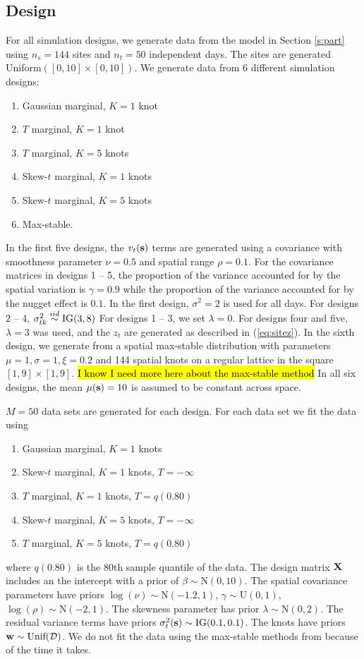 \documentclass[11pt]{article}
\begin{document}
\subsection{Design}\label{s:simdesign}
For all simulation designs, we generate data from the model in Section \ref{s:part} using $n_s=144$ sites and $n_t=50$ independent days.
The sites are generated Uniform$([0, 10] \times [0, 10])$.
We generate data from 6 different simulation designs:
\begin{enumerate} \setlength{\itemsep}{-0.5em}
  \item Gaussian marginal, $K=1$ knot
  \item $T$ marginal, $K=1$ knot
  \item $T$ marginal, $K=5$ knots
  \item Skew-$t$ marginal, $K=1$ knots
  \item Skew-$t$ marginal, $K=5$ knots
  \item Max-stable.
\end{enumerate}
In the first five designs, the $v_t(\mbox{\bf s})$ terms are generated using a \Matern covariance with smoothness parameter $\nu = 0.5$ and spatial range $\rho = 0.1$.
For the covariance matrices in designs 1 -- 5, the proportion of the variance accounted for by the spatial variation is $\gamma = 0.9$ while the proportion of the variance accounted for by the nugget effect is $0.1$.
In the first design, $\sigma^2 = 2$ is used for all days.
For designs 2 -- 4, $\sigma^2_{tk} \stackrel{iid}{\sim} \text{IG}(3, 8)$
For designs 1 -- 3, we set $\lambda = 0$.
For designs four and five, $\lambda = 3$ was used, and the $z_t$ are generated as described in (\ref{eq:sitez}).
In the sixth design, we generate from a spatial max-stable distribution \citep{Reich2012} with parameters $\mu = 1, \sigma=1, \xi=0.2$ and 144 spatial knots on a regular lattice in the square $[1, 9] \times [1, 9]$.
\hl{I know I need more here about the max-stable method}
In all six designs, the mean $\mu(\mbox{\bf s}) = 10$ is assumed to be constant across space.

$M = 50$ data sets are generated for each design.
For each data set we fit the data using
\begin{enumerate} \setlength{\itemsep}{-0.5em}
  \item Gaussian marginal, $K=1$ knots
  \item Skew-$t$ marginal, $K=1$ knots, $T=-\infty$
  \item $T$ marginal, $K=1$ knots, $T=q(0.80)$
  \item Skew-$t$ marginal, $K=5$ knots, $T=-\infty$
  \item $T$ marginal, $K=5$ knots, $T=q(0.80)$
\end{enumerate}
where $q(0.80)$ is the 80th sample quantile of the data.
The design matrix $\mbox{\bf X}$ includes an the intercept with a prior of $\beta \sim \text{N}(0, 10)$.
The spatial covariance parameters have priors $\log(\nu) \sim \text{N}(-1.2, 1)$, $\gamma \sim \text{U}(0, 1)$, $\log(\rho) \sim \text{N}(-2, 1)$.
The skewness parameter has prior $\lambda \sim \text{N}(0, 2)$.
The residual variance terms have priors $\sigma^2_t(\mbox{\bf s}) \sim \text{IG}(0.1, 0.1)$.
The knots have priors $\mbox{\bf w} \sim \text{Unif}({\cal D})$.
We do not fit the data using the max-stable methods from \citet{Reich2012} because of the time it takes.
\end{document}
